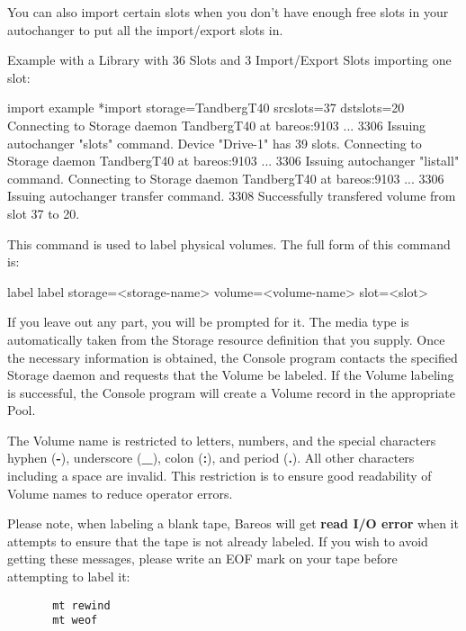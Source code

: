 \begin{description}
   You can also import certain slots when you don't have enough free slots
   in your autochanger to put all the import/export slots in.

   Example with a Library with 36 Slots and 3 Import/Export Slots importing one slot:

\begin{bconsole}{import example}
*import storage=TandbergT40 srcslots=37 dstslots=20
Connecting to Storage daemon TandbergT40 at bareos:9103 ...
3306 Issuing autochanger "slots" command.
Device "Drive-1" has 39 slots.
Connecting to Storage daemon TandbergT40 at bareos:9103 ...
3306 Issuing autochanger "listall" command.
Connecting to Storage daemon TandbergT40 at bareos:9103 ...
3306 Issuing autochanger transfer command.
3308 Successfully transfered volume from slot 37 to 20.
\end{bconsole}

\item [label]
   This command is used to label physical volumes.
   The full form of this command is:

\begin{bconsole}{label}
label storage=<storage-name> volume=<volume-name> slot=<slot>
\end{bconsole}

   If you leave out any part, you will be prompted for it.  The media type
   is automatically taken from the Storage resource definition that you
   supply.  Once the necessary information is obtained, the Console program
   contacts the specified Storage daemon and requests that the Volume be
   labeled.  If the Volume labeling is successful, the Console program will
   create a Volume record in the appropriate Pool.

   The Volume name is restricted to letters, numbers, and the special
   characters hyphen ({\bf -}), underscore ({\bf \_}), colon ({\bf :}), and
   period ({\bf .}).  All other characters including a space are invalid.
   This restriction is to ensure good readability of Volume names to reduce
   operator errors.

   Please note, when labeling a blank tape, Bareos will get {\bf read I/O
   error} when it attempts to ensure that the tape is not already labeled.  If
   you wish to avoid getting these messages, please write an EOF mark on
   your tape before attempting to label it:

\footnotesize
\begin{verbatim}
       mt rewind
       mt weof
\end{verbatim}
\normalsize



\end{description}
